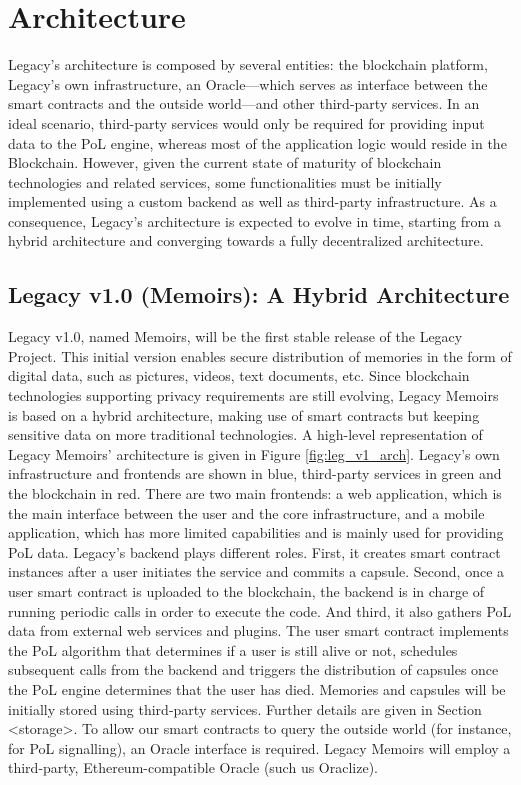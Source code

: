 
\section{Architecture} %
\label{sec:architecture}
Legacy’s architecture is composed by several entities: the blockchain platform, Legacy’s own infrastructure, an Oracle---which serves as interface between the smart contracts and the outside world---and other third-party services. In an ideal scenario, third-party services would only be required for providing input data to the PoL engine, whereas most of the application logic would reside in the Blockchain. However, given the current state of maturity of blockchain technologies and related services, some functionalities must be initially implemented using a custom backend as well as third-party infrastructure. As a consequence, Legacy’s architecture is expected to evolve in time, starting from a hybrid architecture and converging towards a fully decentralized architecture.

\subsection{Legacy v1.0 (Memoirs): A Hybrid Architecture} %
\label{sub:legacy_v1_0_memoirs_a_hybrid_architecture}
Legacy v1.0, named Memoirs, will be the first stable release of the Legacy Project. This initial version enables secure distribution of memories in the form of digital data, such as pictures, videos, text documents, etc. Since blockchain technologies supporting privacy requirements are still evolving, Legacy Memoirs is based on a hybrid architecture, making use of smart contracts but keeping sensitive data on more traditional technologies.
A high-level representation of Legacy Memoirs’ architecture is given in Figure \ref{fig:leg_v1_arch}. Legacy’s own infrastructure and frontends are shown in blue, third-party services in green and the blockchain in red. There are two main frontends: a web application, which is the main interface between the user and the core infrastructure, and a mobile application, which has more limited capabilities and is mainly used for providing PoL data. Legacy’s backend plays different roles. First, it creates smart contract instances after a user initiates the service and commits a capsule. Second, once a user smart contract is uploaded to the blockchain, the backend is in charge of running periodic calls in order to execute the code. And third, it also gathers PoL data from external web services and plugins. The user smart contract implements the PoL algorithm that determines if a user is still alive or not, schedules subsequent calls from the backend and triggers the distribution of capsules once the PoL engine determines that the user has died. 
Memories and capsules will be initially stored using third-party services. Further details are given in Section <storage>.
To allow our smart contracts to query the outside world (for instance, for PoL signalling), an Oracle interface is required. Legacy Memoirs will employ a third-party, Ethereum-compatible Oracle (such us Oraclize).

